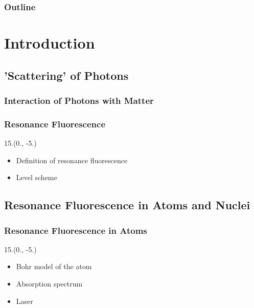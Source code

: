 \documentclass{beamer}
\begin{document}
\begin{frame}
    \titlepage
\end{frame}

\begin{frame}
    \frametitle{Outline}
    \tableofcontents
\end{frame}

\section{Introduction}

\subsection{'Scattering' of Photons}

\begin{frame}
    \frametitle{Interaction of Photons with Matter}
    
\end{frame}

\begin{frame}
    \frametitle{Resonance Fluorescence}
    \begin{textblock}{15.}(0., -5.)
        \begin{itemize}
            \item Definition of resonance fluorescence
            \item Level scheme
        \end{itemize}
    \end{textblock}
\end{frame}

\subsection{Resonance Fluorescence in Atoms and Nuclei}

\begin{frame}
    \frametitle{Resonance Fluorescence in Atoms}
    \begin{textblock}{15.}(0., -5.)
        \begin{itemize}
            \item Bohr model of the atom
            \item Absorption spectrum
            \item Laser
        \end{itemize}
    \end{textblock}
\end{frame}
\end{document}
